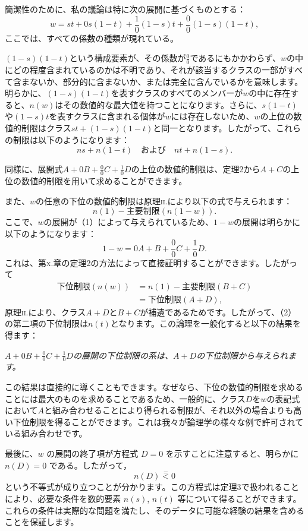 \documentclass[a4paper,11pt,openany]{ltjsbook}
\begin{document}
簡潔性のために、私の議論は特に次の展開に基づくものとする：
\begin{equation*}
w = st + 0s(1 - t) + \frac{1}{0}(1 - s)t + \frac{0}{0}(1 - s)(1 - t),
\tag{2}
\end{equation*}
ここでは、すべての係数の種類が現れている。

$(1-s)(1-t)$という構成要素が、その係数が$\frac{0}{0}$であるにもかかわらず、$w$の中にどの程度含まれているのかは不明であり、それが該当するクラスの一部がすべて含まないか、部分的に含まないか、または完全に含んでいるかを意味します。明らかに、$(1-s)(1-t)$を表すクラスのすべてのメンバーが$w$の中に存在すると、$n(w)$はその数値的な最大値を持つことになります。さらに、$s(1-t)$や$(1-s)t$を表すクラスに含まれる個体が$w$には存在しないため、$w$の上位の数値的制限はクラス$st + (1-s)(1-t)$と同一となります。したがって、これらの制限は以下のようになります：
\[
ns + n(1-t) \quad \text{および} \quad nt + n(1-s).
\]

同様に、展開式$A + 0B + \frac{0}{0}C + \frac{1}{0}D$の上位の数値的制限は、定理2から$A + C$の上位の数値的制限を用いて求めることができます。

また、$w$の任意の下位の数値的制限は原理\textsc{ii.}により以下の式で与えられます：
\[
n(1) - \text{主要制限}(n(1-w)).
\]
ここで、$w$の展開が（1）によって与えられているため、$1-w$の展開は明らかに以下のようになります：
\[
1 - w = 0A + B + \frac{0}{0}C + \frac{1}{0}D.
\]
これは、第\textsc{x.}章の定理2の方法によって直接証明することができます。したがって
\begin{align*}
\text{下位制限}(n(w)) &= n(1) - \text{主要制限}(B + C) \\
&= \text{下位制限}(A + D),
\end{align*}
原理\textsc{ii.}により、クラス$A + D$と$B + C$が補遺であるためです。したがって、（2）の第二項の下位制限は$n(t)$となります。この論理を一般化すると以下の結果を得ます：

\emph{$A + 0B + \frac{0}{0}C + \frac{1}{0}D$の展開の下位制限の系は、$A + D$の下位制限から与えられます。}

この結果は直接的に導くこともできます。なぜなら、下位の数値的制限を求めることには最大のものを求めることであるため、一般的に、クラス$D$を$w$の表記式において$A$と組み合わせることにより得られる制限が、それ以外の場合よりも高い下位制限を得ることができます。これは我々が論理学の様々な例で許可されている組み合わせです。

最後に、$w$ の展開の終了項が方程式 $D = 0$ を示すことに注意すると、明らかに $n(D) = 0$ である。したがって，
\[
  n(D) \stackrel{=}{<} 0
\]
という不等式が成り立つことが分かります。この方程式は定理3で扱われることにより、必要な条件を数的要素 $n(s)$, $n(t)$ 等について得ることができます。これらの条件は実際的な問題を満たし、そのデータに可能な経験の結果を含めることを保証します。
\end{document}
